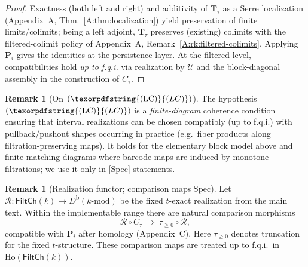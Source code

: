 \documentclass[11pt]{article}
\numberwithin{equation}{section}
\theoremstyle{plain}
\theoremstyle{definition}
\theoremstyle{remark}
\newcommand{\Ho}{\mathrm{Ho}}
\theoremstyle{plain}
\theoremstyle{definition}
\numberwithin{equation}{section}
\theoremstyle{definition}
\newtheorem{remark}[theorem]{Remark}
\DeclareRobustCommand{\LC}{\texorpdfstring{\ensuremath{\mathrm{(LC)}}}{(LC)}}
\numberwithin{equation}{section}
\theoremstyle{plain}
\theoremstyle{definition}
\theoremstyle{remark}
\begin{document}
\begin{proof}
Exactness (both left and right) and additivity of \(\mathbf{T}_\tau\) as a Serre localization (Appendix~A, Thm.~\ref{A:thm:localization}) yield preservation of finite limits/colimits; being a left adjoint, \(\mathbf{T}_\tau\) preserves (existing) colimits with the filtered-colimit policy of Appendix~A, Remark~\ref{A:rk:filtered-colimits}.
Applying \(\mathbf{P}_i\) gives the identities at the persistence layer.
At the filtered level, compatibilities hold \emph{up to f.q.i.} via realization by \(\mathcal{U}\) and the block-diagonal assembly in the construction of \(C_\tau\).
\end{proof}

\begin{remark}[On \((\LC)\)]
The hypothesis \((\LC)\) is a \emph{finite-diagram} coherence condition ensuring that interval realizations can be chosen compatibly (up to f.q.i.) with pullback/pushout shapes occurring in practice (e.g.\ fiber products along filtration-preserving maps).
It holds for the elementary block model above and finite matching diagrams where barcode maps are induced by monotone filtrations; we use it only in \textup{[Spec]} statements.
\end{remark}

\begin{remark}[Realization functor; comparison maps \textup{\lbrack}Spec\textup{\rbrack}]
Let \(\mathcal{R}:\mathsf{FiltCh}(k)\to D^{\mathrm{b}}(k\text{-mod})\) be the fixed \(t\)-exact realization from the main text.
Within the implementable range there are natural comparison morphisms
\[
\mathcal{R}\circ C_\tau\ \Longrightarrow\ \tau_{\ge 0}\circ \mathcal{R},
\]
compatible with \(\mathbf{P}_i\) after homology (Appendix~C).
Here \(\tau_{\ge 0}\) denotes truncation for the fixed \(t\)-structure.
These comparison maps are treated up to f.q.i.\ in \(\Ho(\mathsf{FiltCh}(k))\).
\end{remark}

\end{document}
